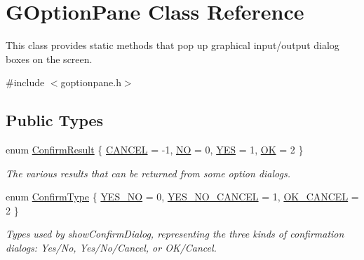 \hypertarget{classGOptionPane}{}\section{G\+Option\+Pane Class Reference}
\label{classGOptionPane}


This class provides static methods that pop up graphical input/output dialog boxes on the screen.  




{\ttfamily \#include $<$goptionpane.\+h$>$}

\subsection*{Public Types}
\begin{DoxyCompactItemize}
\item 
enum \mbox{\hyperlink{classGOptionPane_a1cc9e8685029e39646671ed71f32d47d}{Confirm\+Result}} \{ \mbox{\hyperlink{classGOptionPane_a1cc9e8685029e39646671ed71f32d47dae4842754cb17e5234637e3a85a7f3d90}{C\+A\+N\+C\+EL}} = -\/1, 
\mbox{\hyperlink{classGOptionPane_a1cc9e8685029e39646671ed71f32d47da0d077f5b932ce05e5b9f30c6087a2f31}{NO}} = 0, 
\mbox{\hyperlink{classGOptionPane_a1cc9e8685029e39646671ed71f32d47da99f136a862ba5c7d16967231c29f09d6}{Y\+ES}} = 1, 
\mbox{\hyperlink{classGOptionPane_a1cc9e8685029e39646671ed71f32d47da2bc49ec37d6a5715dd23e85f1ff5bb59}{OK}} = 2
 \}
\begin{DoxyCompactList}\small\item\em The various results that can be returned from some option dialogs. \end{DoxyCompactList}\item 
enum \mbox{\hyperlink{classGOptionPane_a6a1aaf19c06f5a6bef89ea6415547049}{Confirm\+Type}} \{ \mbox{\hyperlink{classGOptionPane_a6a1aaf19c06f5a6bef89ea6415547049a23d16d66a433471aa62deadacecfc08d}{Y\+E\+S\+\_\+\+NO}} = 0, 
\mbox{\hyperlink{classGOptionPane_a6a1aaf19c06f5a6bef89ea6415547049a1c39d83120c95b0b233ddde75ee298b6}{Y\+E\+S\+\_\+\+N\+O\+\_\+\+C\+A\+N\+C\+EL}} = 1, 
\mbox{\hyperlink{classGOptionPane_a6a1aaf19c06f5a6bef89ea6415547049ade4e249d688548d74ae16c0feb84728c}{O\+K\+\_\+\+C\+A\+N\+C\+EL}} = 2
 \}
\begin{DoxyCompactList}\small\item\em Types used by show\+Confirm\+Dialog, representing the three kinds of confirmation dialogs\+: Yes/\+No, Yes/\+No/\+Cancel, or O\+K/\+Cancel. \end{DoxyCompactList}\item 

\end{DoxyCompactItemize}
